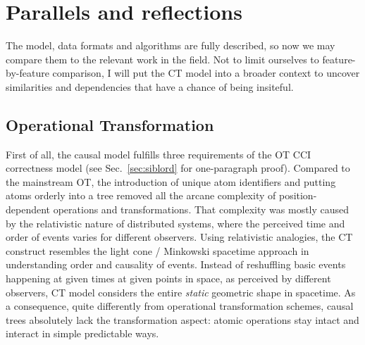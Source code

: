 \documentclass{acm_proc_article-sp}
\begin{document}
\section{Parallels and reflections} \label{sec:reflections}

The model, data formats and algorithms are fully described, so now we may compare them to the relevant work in the field.
Not to limit ourselves to feature-by-feature comparison, I will put the CT model into a broader context to uncover similarities and dependencies that have a chance of being insiteful.

\subsection{Operational Transformation} \label{sec:ot}

First of all, the causal model fulfills three requirements of the OT CCI correctness model (see Sec.~\ref{sec:siblord} for one-paragraph proof).
Compared to the mainstream OT, the introduction of unique atom identifiers and putting atoms orderly into a tree removed all the arcane complexity of position-dependent operations and transformations.
That complexity was mostly caused by the relativistic nature of distributed systems, where the perceived time and order of events varies for different observers.
Using relativistic analogies, the CT construct resembles the light cone / Minkowski spacetime approach in understanding order and causality of events.
Instead of reshuffling basic events happening at given times at given points in space, as perceived by different observers, CT model considers the entire \emph{static} geometric shape in spacetime.
As a consequence, quite differently from operational transformation schemes, causal trees absolutely lack the transformation aspect: atomic operations stay intact and interact in simple predictable ways.
\end{document}
